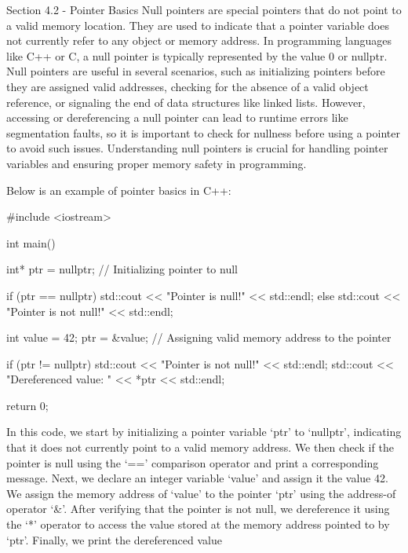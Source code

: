 \begin{notes}{Section 4.2 - Pointer Basics}
    Null pointers are special pointers that do not point to a valid memory location. They are used to indicate that a pointer variable does not currently refer to any object or memory address. In programming languages like C++ or C, a null pointer is 
    typically represented by the value 0 or nullptr. Null pointers are useful in several scenarios, such as initializing pointers before they are assigned valid addresses, checking for the absence of a valid object reference, or signaling the end of 
    data structures like linked lists. However, accessing or dereferencing a null pointer can lead to runtime errors like segmentation faults, so it is important to check for nullness before using a pointer to avoid such issues. Understanding null 
    pointers is crucial for handling pointer variables and ensuring proper memory safety in programming.
    
    \begin{highlight}
        Below is an example of pointer basics in C++:
    
    \begin{code}[C++]   
    #include <iostream>

    int main() {
        int* ptr = nullptr;  // Initializing pointer to null
    
        if (ptr == nullptr) {
            std::cout << "Pointer is null!" << std::endl;
        } else {
            std::cout << "Pointer is not null!" << std::endl;
        }
    
        int value = 42;
        ptr = &value;  // Assigning valid memory address to the pointer
    
        if (ptr != nullptr) {
            std::cout << "Pointer is not null!" << std::endl;
            std::cout << "Dereferenced value: " << *ptr << std::endl;
        }
    
        return 0;
    }
    \end{code}
        In this code, we start by initializing a pointer variable `ptr' to `nullptr', indicating that it does not currently point to a valid memory address. We then check if the pointer is null using the `==' comparison operator and print a 
        corresponding message. Next, we declare an integer variable `value' and assign it the value 42. We assign the memory address of `value' to the pointer `ptr' using the address-of operator `\&'. After verifying that the pointer is not 
        null, we dereference it using the `*' operator to access the value stored at the memory address pointed to by `ptr'. Finally, we print the dereferenced value
    

\end{highlight}
\end{notes}
